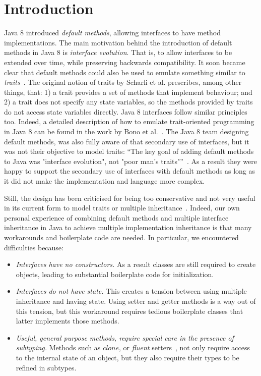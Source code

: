 \section{Introduction}\label{sec:intro}

Java 8 introduced \emph{default methods}, allowing interfaces to have
method implementations. The main motivation behind the introduction of
default methods in Java 8 is \emph{interface evolution}. That is, to
allow interfaces to be extended over time, while preserving backwards
compatibility. It soon became clear that default methods could also be
used to emulate something similar to \emph{traits}~\cite{scharli03traits}. The
original notion of traits by Scharli et al. prescribes, among other
things, that: 1) a trait provides a set of methods that implement
behaviour; and 2) a trait does not specify any state variables, so the
methods provided by traits do not access state variables
directly. Java 8 interfaces follow similar principles too. Indeed, a
detailed description of how to emulate trait-oriented programming in
Java 8 can be found in the work by Bono et al.~\cite{bono14}. The Java 8
team designing default methods, was also fully aware of that secondary
use of interfaces, but it was not their objective to model traits:
``The key goal of adding default methods to Java was "interface
evolution", not "poor man's traits"''~\cite{goetz13default}. As a result
they were happy to support the secondary use of interfaces with
default methods as long as it did not make the implementation and
language more complex.
 
Still, the design has been criticised for being too conservative and 
not very useful in its current form to model traits or multiple 
inheritance~\cite{}. 
Indeed, our own personal experience of combining default methods 
and multiple interface inheritance in Java to achieve multiple implementation 
inheritance is that many workarounds and boilerplate code are needed. 
In particular, we encountered difficulties because:

\begin{itemize}

\item {\em Interfaces have no constructors.} As a result classes are 
still required to create objects, leading to substantial boilerplate 
code for initialization.

\item {\em Interfaces do not have state.} This creates a tension between 
 using multiple inheritance and having state. Using setter and
  getter methods is a way out of this tension, but this workaround
  requires tedious boilerplate classes that latter implements those
  methods.

\item {\em Useful, general purpose methods, require special care in
  the presence of subtyping.} Methods such as $clone$, or
  \emph{fluent} setters~\cite{fowler2005fluentinterface}, not only require access to the
  internal state of an object, but they also require their types to be
  refined in subtypes.

\end{itemize}

